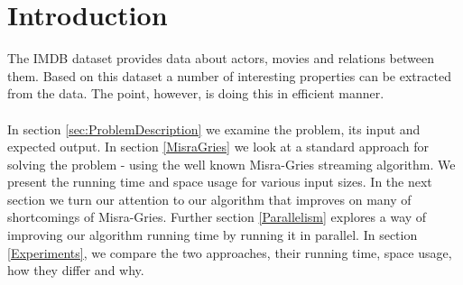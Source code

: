 \label{Introduction}
\section{Introduction}

The IMDB dataset provides data about actors, movies and relations between them. Based on this dataset a number of interesting properties can be extracted from the data. The point, however, is doing this in efficient manner.
\\
\\
In section \ref{sec:ProblemDescription} we examine the problem, its input and expected output. In section \ref{MisraGries} we look at a standard approach for solving the problem - using the well known Misra-Gries streaming algorithm. We present the running time and space usage for various input sizes. In the next section we turn our attention to our algorithm that improves on many of shortcomings of Misra-Gries. Further section \ref{Parallelism} explores a way of improving our algorithm running time by running it in parallel. In section \ref{Experiments}, we compare the two approaches, their running time, space usage, how they differ and why.